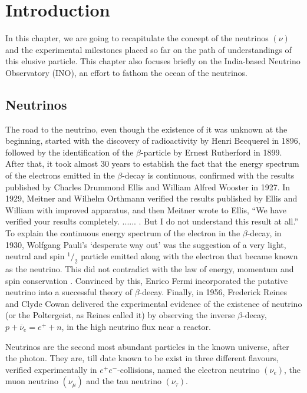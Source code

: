 \chapter{Introduction}
In this chapter, we are going to recapitulate the concept of the neutrinos $\left(\nu\right)$ and the experimental milestones placed so far on the path of understandings of this elusive particle. This chapter also focuses briefly on the India-based Neutrino Observatory (INO), an effort to fathom the ocean of the neutrinos.

\section{Neutrinos}
The road to the neutrino\cite{roadtoneut}, even though the existence of it was unknown at the beginning, started with the discovery of radioactivity by Henri Becquerel in 1896, followed by the identification of the $\beta$-particle by Ernest Rutherford in
1899. After that, it took almost 30 years to establish the fact that the energy spectrum of the electrons emitted in the $\beta$-decay is continuous, confirmed with the results published by Charles Drummond Ellis and William Alfred Wooster in 1927. In 1929, Meitner and Wilhelm Orthmann verified the results published by Ellis and William with improved apparatus, and then Meitner wrote to Ellis, ``We have verified your results completely. ...... . But I do not understand this result at all.'' To explain the continuous energy spectrum of the electron in the $\beta$-decay, in 1930, Wolfgang Pauli's `desperate way out' was the suggestion of a very light, neutral and spin $^1/_2$ particle emitted along with the electron that became known as the neutrino. This did not contradict with the law of energy, momentum and spin conservation%
. Convinced by this, Enrico Fermi incorporated the putative neutrino into a successful theory of $\beta$-decay. Finally, in 1956, Frederick Reines and Clyde Cowan delivered the experimental evidence of the existence of neutrino (or the Poltergeist, as Reines called it) by observing the inverse $\beta$-decay, $p+\overline{\nu}_e=e^++n$, in the high neutrino flux near a reactor.

Neutrinos are the second most abundant particles in the known universe, after the photon. They are, till date known to be exist in three different flavours, verified experimentally in \mbox{$e^+e^-$-collisions\cite{numberneut}}, named the electron neutrino $\left(\nu_e\right)$, the muon neutrino $\left(\nu_{\mu}\right)$ and the tau neutrino $\left(\nu_{\tau}\right)$.

